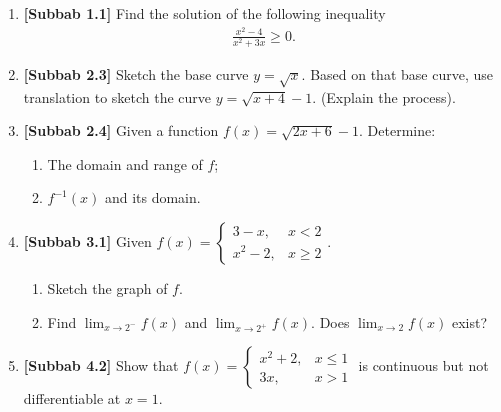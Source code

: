 \documentclass[10pt,openany,a4paper]{article}
\theoremstyle{definition}
\theoremstyle{definition}
\theoremstyle{plain}
\begin{document}
\newpage

\begin{enumerate}
    \item \textbf{[Subbab 1.1]} Find the solution of the following inequality
    \begin{align*}
        \frac{x^2-4}{x^2+3x}\geq 0.
    \end{align*}

    \item \textbf{[Subbab 2.3]} Sketch the base curve $y=\sqrt{x}$. Based on that base curve, use translation to sketch the curve $y=\sqrt{x+4}-1$. (Explain the process).

    \item \textbf{[Subbab 2.4]} Given a function $f(x)=\sqrt{2x+6}-1$. Determine:
    \begin{enumerate}
        \item[a)] The domain and range of $f$;
        \item[b)] $f^{-1}(x)$ and its domain.
    \end{enumerate}

    \item \textbf{[Subbab 3.1]} Given $f(x)=\begin{cases}
        3-x, & x<2\\
        x^2-2, & x\geq 2
    \end{cases}$.
    \begin{enumerate}
        \item[a.] Sketch the graph of $f$.
        \item[b.] Find $\displaystyle\lim_{x\to 2^-}f(x)$ and $\displaystyle\lim_{x\to 2^+}f(x)$. Does $\displaystyle\lim_{x\to 2}f(x)$ exist?
    \end{enumerate}

    \item \textbf{[Subbab 4.2]} Show that $f(x)=\begin{cases}
        x^2+2, & x\leq 1\\
        3x, & x>1
    \end{cases}$ is continuous but not differentiable at $x=1$.
\end{enumerate}
\end{document}
